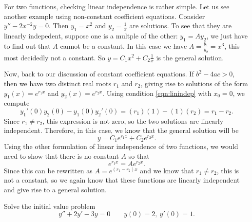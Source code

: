 \documentclass{ximera}
\begin{document}
For two functions, checking linear independence is rather simple.  Let us see another example using non-constant coefficient equations.  Consider $y''-2x^{-2}y = 0$.  Then $y_1 = x^2$ and $y_2 = \frac{1}{x}$ are solutions.  To see that they are linearly indepedent, suppose one is a multple of the other: $y_1 = A y_2$, we just have to find out that $A$ cannot be a constant.  In this case we have $A = \frac{y_1}{y_2} = x^3$, this most decidedly not a constant. So $y = C_1 x^2 + C_2 \frac{1}{x}$ is the general solution.

Now, back to our discussion of constant coefficient equations. If $b^2 - 4ac > 0$, then we have two distinct real roots $r_1$ and $r_2$, giving rise to solutions of the form $y_1(x) = e^{r_1x}$ and $y_2(x) = e^{r_2x}$. Using condition \ref{eqn:linindep} with $x_0 = 0$, we compute
\begin{equation*}
    y_1'(0)y_2(0) - y_1(0)y_2'(0) = (r_1)(1) - (1)(r_2) = r_1 - r_2.
\end{equation*}
Since $r_1 \neq r_2$, this expression is not zero, so the two solutions are linearly independent. Therefore, in this case, we know that the general solution will be
\begin{equation*}
    y = C_1e^{r_1x} + C_2e^{r_2x}.
\end{equation*}
Using the other formulation of linear independence of two functions, we would need to show that there is no constant $A$ so that 
\[ 
    e^{r_1x} = A e^{r_2x}. 
\] 
Since this can be rewritten as $A = e^{(r_1-r_2)x}$ and we know that $r_1 \neq r_2$, this is not a constant, so we again know that these functions are linearly independent and give rise to a general solution.

\begin{example}
    Solve the initial value problem
    \begin{equation*}
        y'' + 2y' - 3y = 0 \qquad y(0) = 2,\ y'(0) = 1. 
    \end{equation*}
\end{example}
\end{document}
